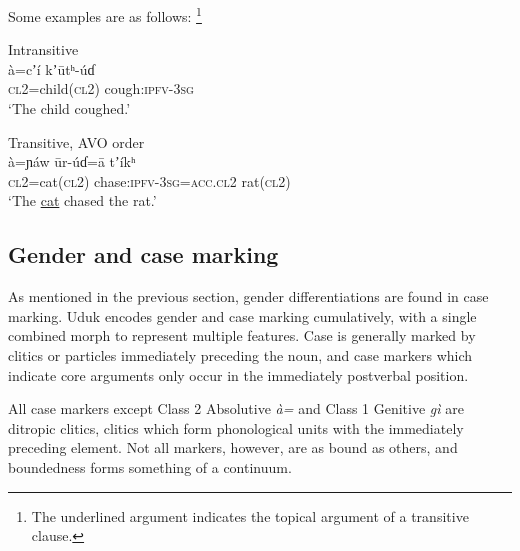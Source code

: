 \documentclass[output=collectionpaper,hidelinks]{langscibook}
\theoremstyle{remark}
\begin{document}
Some examples are as follows:%
\footnote{The underlined argument indicates the
topical argument of a transitive clause.}

\ea
Intransitive \\
\gll à=cʼí kʼūtʰ-úɗ \\
 \textsc{cl2}=child(\textsc{cl2}) cough:\textsc{ipfv}-\textsc{3sg} \\
\glt `The child coughed.' \\
\z

\ea
 Transitive, AVO order \\
 \gll à=ɲáw ūr-úɗ=ā tʼíkʰ \\
 \textsc{cl2}=cat(\textsc{cl2}) chase:\textsc{ipfv}-\textsc{3sg}=\textsc{acc.cl2} rat(\textsc{cl2}) \\
\glt `The \uline{cat} chased the rat.' \\
\z

%


\subsection{Gender and case marking}
\label{sec:Don:Case_Marking}

As mentioned in the previous section, gender differentiations are found in case
marking. Uduk encodes gender and case marking cumulatively, with a single
combined morph to represent multiple features. Case is generally marked by
clitics or particles immediately preceding the noun, and case markers which
indicate core arguments only occur in the immediately postverbal position.

All case markers except Class 2 Absolutive \emph{à=} and Class 1 Genitive
\emph{gì} are ditropic clitics, clitics which form phonological units with the
immediately preceding element. Not all markers, however, are as bound as
others, and boundedness forms something of a continuum.
\end{document}
